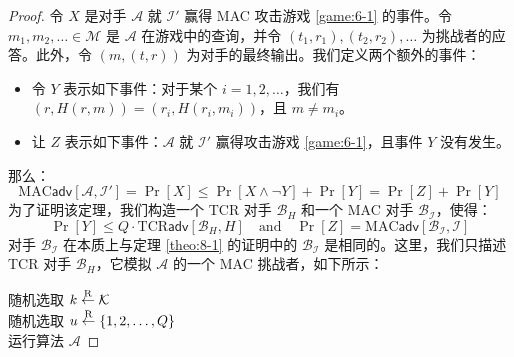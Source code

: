\begin{proof}
令 $X$ 是对手 $\mathcal{A}$ 就 $\mathcal{I}'$ 赢得 MAC 攻击游戏 \ref{game:6-1} 的事件。令 $m_1,m_2,\dots\in\mathcal{M}$ 是 $\mathcal{A}$ 在游戏中的查询，并令 $(t_1,r_1),(t_2,r_2),\dots$ 为挑战者的应答。此外，令 $(m,(t,r))$ 为对手的最终输出。我们定义两个额外的事件：
\begin{itemize}
	\item 令 $Y$ 表示如下事件：对于某个 $i=1,2,\dots$，我们有 $(r,H(r,m))=(r_i,H(r_i,m_i))$，且 $m\neq m_i$。
	\item 让 $Z$ 表示如下事件：$\mathcal{A}$ 就 $\mathcal{I}'$ 赢得攻击游戏 \ref{game:6-1}，且事件 $Y$ 没有发生。
\end{itemize}
那么：
\begin{equation}\label{eq:8-21}
\mathrm{MAC}\mathsf{adv}[\mathcal{A},\mathcal{I}']=
\Pr[X]\leq
\Pr[X\land\lnot Y]+\Pr[Y]=
\Pr[Z]+\Pr[Y]
\end{equation}
为了证明该定理，我们构造一个 TCR 对手 $\mathcal{B}_H$ 和一个 MAC 对手 $\mathcal{B}_\mathcal{I}$，使得：
\[
\Pr[Y]\leq
Q\cdot\mathrm{TCR}\mathsf{adv}[\mathcal{B}_H,H]
\quad\text{and}\quad
\Pr[Z]=\mathrm{MAC}\mathsf{adv}[\mathcal{B}_\mathcal{I},\mathcal{I}]
\]
对手 $\mathcal{B}_\mathcal{I}$ 在本质上与定理 \ref{theo:8-1} 的证明中的 $\mathcal{B}_\mathcal{I}$ 是相同的。这里，我们只描述 TCR 对手 $\mathcal{B}_H$，它模拟 $\mathcal{A}$ 的一个 MAC 挑战者，如下所示：

\vspace{5pt}

\hspace*{5pt} 随机选取 $k\overset{\rm R}\leftarrow\mathcal{K}$\\
\hspace*{26pt} 随机选取 $u\overset{\rm R}\leftarrow\{1,2,\dots,Q\}$\\
\hspace*{26pt} 运行算法 $\mathcal{A}$

\vspace{5pt}


\end{proof}

